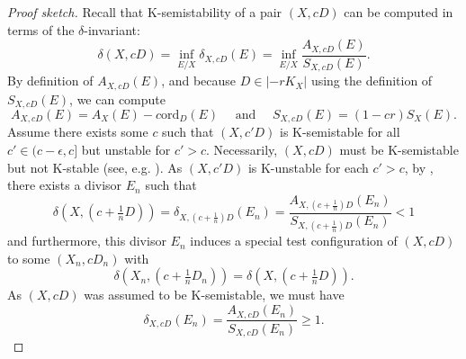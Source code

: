 \documentclass[11pt]{amsart}
\numberwithin{equation}{section}
\theoremstyle{definition}
\newcommand{\ord}{\mathrm{ord}}
\begin{document}
\begin{proof}[Proof sketch]
    Recall that K-semistability of a pair $(X,cD)$ can be computed in terms of the $\delta$-invariant: 
    \[ \delta(X,cD) = \inf_{E/X}\delta_{X,cD}(E) = \inf_{E/X}\frac{A_{X,cD}(E)}{S_{X,cD}(E)}. \]
    By definition of $A_{X,cD}(E)$, and because $D \in |-rK_X|$  using the definition of $S_{X,cD}(E)$, we can compute 
    \[ A_{X,cD}(E) = A_{X}(E) - c \ord_D(E)\quad \text{  and  } \quad S_{X,cD}(E) = (1-cr) S_{X}(E).\] Assume there exists some $c$ such that $(X,c'D)$ is K-semistable for all $c' \in (c-\epsilon, c]$ but unstable for $c' > c$.  Necessarily, $(X,cD)$ must be K-semistable but not K-stable (see, e.g. \cite[Proposition 3.18]{ADLpub}).  As $(X,c'D)$ is K-unstable for each $c' > c$, by \cite[Theorem 1.2]{LXZ}, there exists a divisor $E_n$ such that  
    \[ \delta(X,(c+\tfrac{1}{n}D)) = \delta_{X,(c+\frac{1}{n})D}(E_n) = \frac{A_{X,(c+\frac{1}{n})D}(E_n)}{S_{X,(c+\frac{1}{n})D}(E_n)} < 1 \]  and furthermore, this divisor $E_n$ induces a special test configuration of $(X,cD)$ to some $(X_n, cD_n)$ with 
    \[ \delta(X_n,(c+\tfrac{1}{n}D_n)) = \delta(X,(c+\tfrac{1}{n}D)). \]
    As $(X,cD)$ was assumed to be K-semistable, we must have
    \[ \delta_{X,cD}(E_n) = \frac{ A_{X,cD}(E_n) }{S_{X,cD}(E_n) }\ge  1 .\]


\end{proof}
\end{document}
